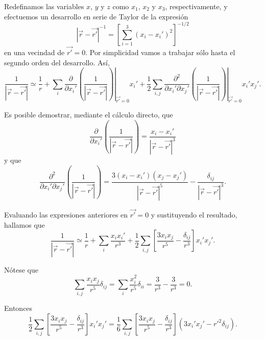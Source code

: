 \documentclass[12pt,a4paper]{book}
\begin{document}
Redefinamos las variables $x$, $y$ y $z$ como $x_1$, $x_2$ y $x_3$, respectivamente, y efectuemos un desarrollo en serie de Taylor de la expresión
\begin{equation}
|\vec{r} - \vec{r'}|^{-1} = \left[\sum_{i=1}^{3}(x_i - x_i')^2\right]^{-1/2}
\end{equation}
en una vecindad de $\vec{r'} = 0$. Por simplicidad vamos a trabajar sólo hasta el segundo orden del desarrollo. Así,
\begin{equation}
\frac{1}{|\vec{r} - \vec{r'}|} \simeq \frac{1}{r} + \sum_{i}\left.\frac{\partial}{\partial x_i'}\left(\frac{1}{|\vec{r} - \vec{r'}|}\right)\right|_{\vec{r'}=0}x_i' + \frac{1}{2}\sum_{i,j}\left.\frac{\partial^2}{\partial x_i'\partial x_j'}\left(\frac{1}{|\vec{r} - \vec{r'}|}\right)\right|_{\vec{r'}=0}x_i'x_j'.
\end{equation}

Es posible demostrar, mediante el cálculo directo, que
\begin{equation}
\frac{\partial}{\partial x_i'}\left(\frac{1}{|\vec{r} - \vec{r'}|}\right) = \frac{x_i - x_i'}{|\vec{r} - \vec{r'}|^3}
\end{equation}
y que
\begin{equation}
\frac{\partial^2}{\partial x_i'\partial x_j'}\left(\frac{1}{|\vec{r} - \vec{r'}|}\right) = \frac{3(x_i - x_i')(x_j - x_j')}{|\vec{r} - \vec{r'}|^5} - \frac{\delta_{ij}}{|\vec{r} - \vec{r'}|^3}.
\end{equation}

Evaluando las expresiones anteriores en $\vec{r'} = 0$ y sustituyendo el resultado, hallamos que
\begin{equation}
\frac{1}{|\vec{r} - \vec{r'}|} \simeq \frac{1}{r} + \sum_{i}\frac{x_i x_i'}{r^3} + \frac{1}{2}\sum_{i,j}\left[\frac{3x_i x_j}{r^5} - \frac{\delta_{ij}}{r^3}\right]x_i'x_j'.
\end{equation}

Nótese que
\begin{equation}
\sum_{i,j}\frac{x_i x_j}{r^5}\delta_{ij} = \sum_{i}\frac{x_i^2}{r^5}\delta_{ii} = \frac{3}{r^3} - \frac{3}{r^3} = 0.
\end{equation}

Entonces
\begin{equation}
\frac{1}{2}\sum_{i,j}\left[\frac{3x_i x_j}{r^5} - \frac{\delta_{ij}}{r^3}\right]x_i'x_j' = \frac{1}{6}\sum_{i,j}\left[\frac{3x_i x_j}{r^5} - \frac{\delta_{ij}}{r^3}\right](3x_i'x_j' - r'^2\delta_{ij}).
\end{equation}
\end{document}

